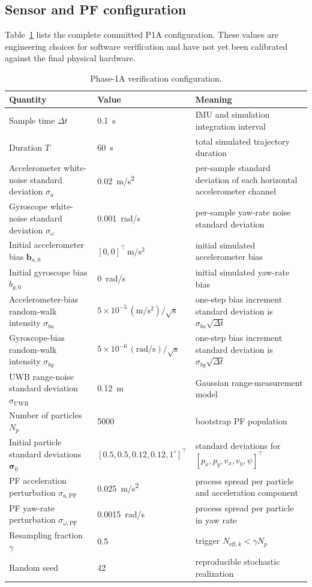 \subsection{Sensor and PF configuration}
Table~\ref{tab:p1config} lists the complete committed P1A configuration. These values are engineering choices for software verification and have not yet been calibrated against the final physical hardware.

\begin{table}[ht]
\centering
\caption{Phase-1A verification configuration.}
\label{tab:p1config}
\begin{tabular}{p{}p{}p{}}
\toprule
Quantity & Value & Meaning\\
\midrule
Sample time $\Delta t$ & \SI{0.1}{s} & IMU and simulation integration interval\\
Duration $T$ & \SI{60}{s} & total simulated trajectory duration\\
Accelerometer white-noise standard deviation $\sigma_a$ & \SI{0.02}{m/s^2} & per-sample standard deviation of each horizontal accelerometer channel\\
Gyroscope white-noise standard deviation $\sigma_{\omega}$ & \SI{0.001}{rad/s} & per-sample yaw-rate noise standard deviation\\
Initial accelerometer bias $\bm{b}_{a,0}$ & $[0,0]^\top\,\mathrm{m/s^2}$ & initial simulated accelerometer bias\\
Initial gyroscope bias $b_{g,0}$ & \SI{0}{rad/s} & initial simulated yaw-rate bias\\
Accelerometer-bias random-walk intensity $\sigma_{ba}$ & $5\times10^{-5}\,\mathrm{(m/s^2)/\sqrt{s}}$ & one-step bias increment standard deviation is $\sigma_{ba}\sqrt{\Delta t}$\\
Gyroscope-bias random-walk intensity $\sigma_{bg}$ & $5\times10^{-6}\,\mathrm{(rad/s)/\sqrt{s}}$ & one-step bias increment standard deviation is $\sigma_{bg}\sqrt{\Delta t}$\\
UWB range-noise standard deviation $\sigma_{\mathrm{UWB}}$ & \SI{0.12}{m} & Gaussian range-measurement model\\
Number of particles $N_p$ & 5000 & bootstrap PF population\\
Initial particle standard deviations $\bm{\sigma}_0$ & $[0.5,0.5,0.12,0.12,1^\circ]^\top$ & standard deviations for $[p_x,p_y,v_x,v_y,\psi]^\top$\\
PF acceleration perturbation $\sigma_{a,\mathrm{PF}}$ & \SI{0.025}{m/s^2} & process spread per particle and acceleration component\\
PF yaw-rate perturbation $\sigma_{\omega,\mathrm{PF}}$ & \SI{0.0015}{rad/s} & process spread per particle in yaw rate\\
Resampling fraction $\gamma$ & 0.5 & trigger $N_{\mathrm{eff},k}<\gamma N_p$\\
Random seed & 42 & reproducible stochastic realization\\
\bottomrule
\end{tabular}
\end{table}

